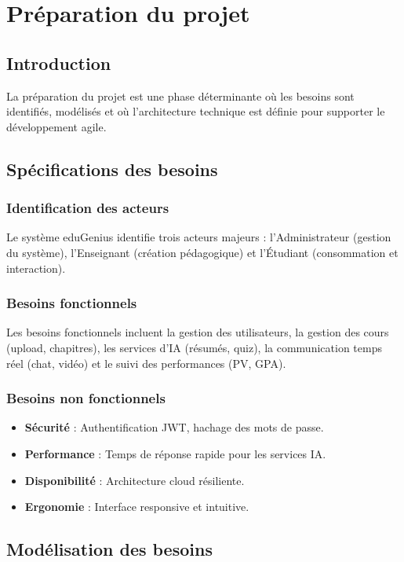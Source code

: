 \chapter{Préparation du projet}

\section{Introduction}
La préparation du projet est une phase déterminante où les besoins sont identifiés, modélisés et où l'architecture technique est définie pour supporter le développement agile.

\section{Spécifications des besoins}
\subsection{Identification des acteurs}
Le système eduGenius identifie trois acteurs majeurs : l'Administrateur (gestion du système), l'Enseignant (création pédagogique) et l'Étudiant (consommation et interaction).

\subsection{Besoins fonctionnels}
Les besoins fonctionnels incluent la gestion des utilisateurs, la gestion des cours (upload, chapitres), les services d'IA (résumés, quiz), la communication temps réel (chat, vidéo) et le suivi des performances (PV, GPA).

\subsection{Besoins non fonctionnels}
\begin{itemize}
    \item \textbf{Sécurité} : Authentification JWT, hachage des mots de passe.
    \item \textbf{Performance} : Temps de réponse rapide pour les services IA.
    \item \textbf{Disponibilité} : Architecture cloud résiliente.
    \item \textbf{Ergonomie} : Interface responsive et intuitive.
\end{itemize}

\section{Modélisation des besoins}
